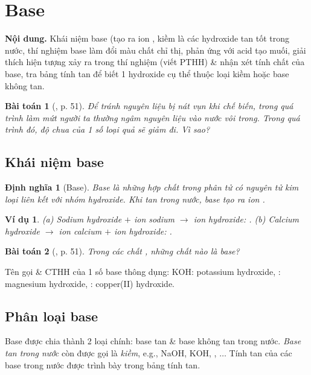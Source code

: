 \documentclass{article}
\newtheorem{baitoan}{Bài toán}
\newtheorem{dinhnghia}{Định nghĩa}
\newtheorem{vidu}{Ví dụ}
\begin{document}

\section{Base}
\textsf{\textbf{Nội dung.} Khái niệm base (tạo ra ion , kiềm là các hydroxide tan tốt trong nước, thí nghiệm base làm đổi màu chất chỉ thị, phản ứng với acid tạo muối, giải thích hiện tượng xảy ra trong thí nghiệm (viết PTHH) \& nhận xét tính chất của base, tra bảng tính tan để biết 1 hydroxide cụ thể thuộc loại kiềm hoặc base không tan.}

\begin{baitoan}[\cite{SGK_KHTN_8_Canh_Dieu}, p. 51]
	Để tránh nguyên liệu bị nát vụn khi chế biến, trong quá trình làm mứt người ta thường ngâm nguyên liệu vào nước vôi trong. Trong quá trình đó, độ chua của 1 số loại quả sẽ giảm đi. Vì sao?
\end{baitoan}

\subsection{Khái niệm base}

\begin{dinhnghia}[Base]
	\emph{Base} là những hợp chất trong phân tử có nguyên tử kim loại liên kết với nhóm hydroxide. Khi tan trong nước, base tạo ra ion \emph{}.
\end{dinhnghia}

\begin{vidu}
	(a) Sodium hydroxide $+$ ion sodium $\to$ ion hydroxide: \emph{}. (b) Calcium hydroxide $\to$ ion calcium $+$ ion hydroxide: \emph{}.
\end{vidu}

\begin{baitoan}[\cite{SGK_KHTN_8_Canh_Dieu}, p. 51]
	Trong các chất \emph{}, những chất nào là base?
\end{baitoan}
Tên gọi \& CTHH của 1 số base thông dụng: KOH: potassium hydroxide, : magnesium hydroxide, : copper(II) hydroxide.

\subsection{Phân loại base}
Base được chia thành 2 loại chính: base tan \& base không tan trong nước. \textit{Base tan trong nước} còn được gọi là \textit{kiềm}, e.g., NaOH, KOH, , $\ldots$ Tính tan của các base trong nước được trình bày trong bảng tính tan.
\end{document}

